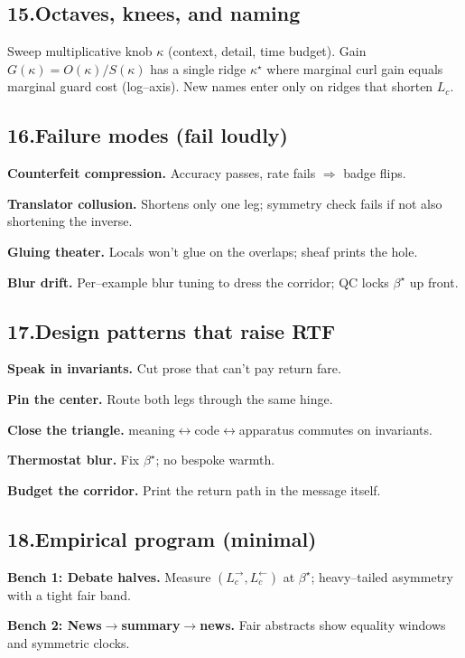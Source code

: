 \documentclass[11pt]{article}
\begin{document}
\subsection*{15.\quad Octaves, knees, and naming}
Sweep multiplicative knob $\kappa$ (context, detail, time budget). Gain $G(\kappa)=O(\kappa)/S(\kappa)$ has a single ridge $\kappa^\star$ where marginal curl gain equals marginal guard cost (log--axis). New names enter only on ridges that shorten $L_c$.

\subsection*{16.\quad Failure modes (fail loudly)}
\textbf{Counterfeit compression.} Accuracy passes, rate fails $\Rightarrow$ badge flips.

\textbf{Translator collusion.} Shortens only one leg; symmetry check fails if not also shortening the inverse.

\textbf{Gluing theater.} Locals won't glue on the overlaps; sheaf prints the hole.

\textbf{Blur drift.} Per--example blur tuning to dress the corridor; QC locks $\beta^\star$ up front.

\subsection*{17.\quad Design patterns that raise RTF}
\textbf{Speak in invariants.} Cut prose that can’t pay return fare.

\textbf{Pin the center.} Route both legs through the same hinge.

\textbf{Close the triangle.} meaning$\leftrightarrow$code$\leftrightarrow$apparatus commutes on invariants.

\textbf{Thermostat blur.} Fix $\beta^\star$; no bespoke warmth.

\textbf{Budget the corridor.} Print the return path in the message itself.

\subsection*{18.\quad Empirical program (minimal)}
\textbf{Bench 1: Debate halves.} Measure $(L^{\rightarrow}_c,L^{\leftarrow}_c)$ at $\beta^\star$; heavy--tailed asymmetry with a tight fair band.

\textbf{Bench 2: News$\to$summary$\to$news.} Fair abstracts show equality windows and symmetric clocks.
\end{document}

